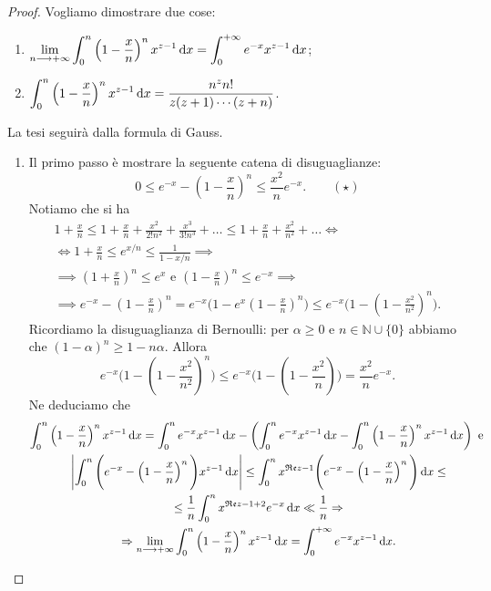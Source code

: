 \begin{proof}
  Vogliamo dimostrare due cose:
  \begin{enumerate}
    \item $\displaystyle \lim_{n \longrightarrow +\infty} \int_0^n \left(1-\frac{x}{n}\right)^nx^{z-1}\mathop{}\!\mathrm{d} x=\int_0^{+\infty} e^{-x}x^{z-1}\mathop{}\!\mathrm{d} x$;
    \item $\displaystyle \int_0^n \left(1-\frac{x}{n}\right)^nx^{z-1}\mathop{}\!\mathrm{d} x=\frac{n^zn!}{z(z+1)\cdots(z+n)}$.
  \end{enumerate}
  La tesi seguirà dalla formula di Gauss.
  \begin{enumerate}
    \item Il primo passo è mostrare la seguente catena di disuguaglianze:
    $$0 \le e^{-x}-\left(1-\frac{x}{n}\right)^n \le \frac{x^2}{n}e^{-x}. \qquad (\star)$$
    Notiamo che si ha
    \begin{gather*}
      1+\frac{x}{n} \le 1+\frac{x}{n}+\frac{x^2}{2!n^2}+\frac{x^3}{3!n^3}+\dots \le 1+\frac{x}{n}+\frac{x^2}{n^2}+\dots \iff \\
      \iff 1+\frac{x}{n} \le e^{x/n} \le \frac{1}{1-x/n} \implies \\
      \implies \left(1+\frac{x}{n}\right)^n \le e^x \text{ e } \left(1-\frac{x}{n}\right)^n \le e^{-x} \implies \\
      \implies e^{-x}-\left(1-\frac{x}{n}\right)^n=e^{-x}\Bigg(1-e^x\left(1-\frac{x}{n}\right)^n\Bigg) \le e^{-x}\Bigg(1-\left(1-\frac{x^2}{n^2}\right)^n\Bigg).
    \end{gather*}
    Ricordiamo la disuguaglianza di Bernoulli: per $\alpha \ge 0$ e $n \in \mathbb{N}\cup\{0\}$ abbiamo che $(1-\alpha)^n \ge 1-n\alpha$. Allora
    $$e^{-x}\Bigg(1-\left(1-\frac{x^2}{n^2}\right)^n\Bigg) \le e^{-x}\Bigg(1-\left(1-\frac{x^2}{n}\right)\Bigg)=\frac{x^2}{n}e^{-x}.$$
    Ne deduciamo che
    \begin{gather*}
      \int_0^n \left(1-\frac{x}{n}\right)^nx^{z-1}\diff x=\int_0^n e^{-x}x^{z-1}\diff x-\left(\int_0^n e^{-x}x^{z-1}\diff x-\int_0^n\left(1-\frac{x}{n}\right)^nx^{z-1}\diff x\right) \text{ e } \\
      \left|\int_0^n\Bigg(e^{-x}-\left(1-\frac{x}{n}\right)^n\Bigg)x^{z-1}\diff x\right| \le \int_0^n x^{\mathfrak{Re}z-1}\Bigg(e^{-x}-\left(1-\frac{x}{n}\right)^n\Bigg)\diff x \le \\
      \le \frac{1}{n} \int_0^n x^{\mathfrak{Re}z-1+2}e^{-x}\diff x \ll \frac{1}{n} \implies \\
      \implies \lim_{n \longrightarrow +\infty} \int_0^n \left(1-\frac{x}{n}\right)^nx^{z-1}\diff x=\int_0^{+\infty} e^{-x}x^{z-1}\diff x.

\end{gather*}
\end{enumerate}
\end{proof}
